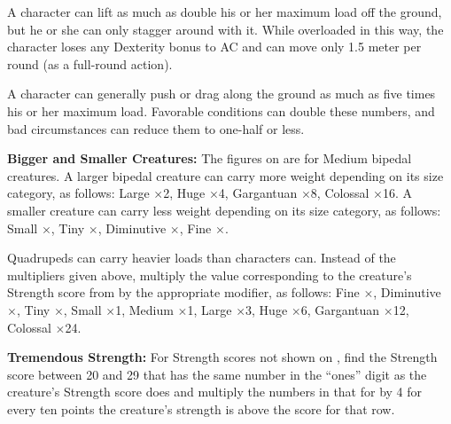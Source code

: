 A character can lift as much as double his or her maximum load off the ground, but he or she can only stagger around with it. While overloaded in this way, the character loses any Dexterity bonus to AC and can move only 1.5 meter per round (as a full-round action).

A character can generally push or drag along the ground as much as five times his or her maximum load. Favorable conditions can double these numbers, and bad circumstances can reduce them to one-half or less.

\textbf{Bigger and Smaller Creatures:} The figures on  are for Medium bipedal creatures. A larger bipedal creature can carry more weight depending on its size category, as follows: Large $\times$2, Huge $\times$4, Gargantuan $\times$8, Colossal $\times$16. A smaller creature can carry less weight depending on its size category, as follows: Small $\times$\threequarters, Tiny $\times$\onehalf, Diminutive $\times$\onequarter, Fine $\times$\oneeighth.

Quadrupeds can carry heavier loads than characters can. Instead of the multipliers given above, multiply the value corresponding to the creature's Strength score from  by the appropriate modifier, as follows: Fine $\times$\onequarter, Diminutive $\times$\onehalf, Tiny $\times$\threequarters, Small $\times$1, Medium $\times$1\onehalf, Large $\times$3, Huge $\times$6, Gargantuan $\times$12, Colossal $\times$24.

\textbf{Tremendous Strength:} For Strength scores not shown on , find the Strength score between 20 and 29 that has the same number in the ``ones'' digit as the creature's Strength score does and multiply the numbers in that for by 4 for every ten points the creature's strength is above the score for that row.
